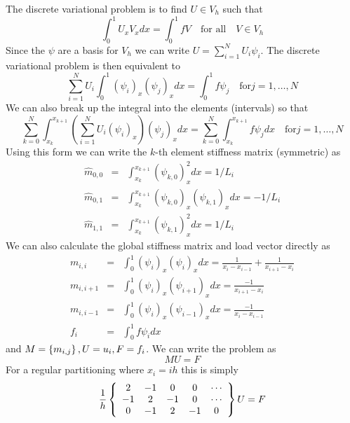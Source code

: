 \documentclass[10pt,dvips,twoside,reqno]{amsart}
\begin{document}
The discrete variational problem is to find $U \in V_h$ such that
\begin{equation}
\int_0^1 U_x V_x dx = \int_0^1 f V \quad \mbox{for all} \quad V \in V_h
\end{equation}
Since the $\psi$ are a basis for $V_h$ we can write $U = \sum_{i=1}^N U_i \psi_i$. The discrete variational problem is then equivalent to 
\begin{equation}
\sum_{i=1}^{N} U_{i} \int_0^1  (\psi_{i})_x (\psi_{j})_x dx = \int_0^1 f \psi_j \quad \mbox{for} j=1,\dots,N
\end{equation}
We can also break up the integral into the elements (intervals) so that
\begin{equation}
\sum_{k=0}^{N} \int_{x_k}^{x_{k+1}} (\sum_{i=1}^{N} U_i (\psi_i)_x)(\psi_j)_x dx = \sum_{k=0}^{N} \int_{x_k}^{x_{k+1}} f \psi_j dx \quad \mbox{for} j=1,\dots,N
\end{equation}
Using this form we can write the $k$-th element stiffness matrix (symmetric) as
\begin{eqnarray}
\hat{m}_{0,0} &=& \int_{x_k}^{x_{k+1}} (\psi_{k,0})_x^2 dx = 1/L_i \\
\hat{m}_{0,1} &=& \int_{x_k}^{x_{k+1}} (\psi_{k,0})_x (\psi_{k,1})_x dx = -1/L_i\\
\hat{m}_{1,1} &=& \int_{x_k}^{x_{k+1}} (\psi_{k,1})_x^2 dx = 1/L_i
\end{eqnarray}
We can also calculate the global stiffness matrix and load vector directly as
\begin{eqnarray}
m_{i,i} &=& \int_0^1  (\psi_{i})_x (\psi_{i})_x dx = \frac{1}{x_i - x_{i-1}} +\frac{1}{x_{i+1} - x_{i}} \\
m_{i,i+1} &=& \int_0^1  (\psi_{i})_x (\psi_{i+1})_x dx = \frac{-1}{x_{i+1} - x_{i}} \\
m_{i,i-1} &=& \int_0^1  (\psi_{i})_x (\psi_{i-1})_x dx = \frac{-1}{x_{i} - x_{i-1}} \\
f_i &=& \int_0^1 f \psi_i dx
\end{eqnarray}
and $M = \left\{ m_{i,j} \right\}, U = u_i, F = f_i$. We can write the problem as
\begin{equation}
M U = F
\end{equation}
For a regular partitioning where $x_i = ih$ this is simply
\begin{equation}
\frac{1}{h} \left\{ \begin{array}{ccccc}
 2 & -1 &  0 &  0 & \cdots \\
-1 &  2 & -1 &  0 & \cdots \\
 0 & -1 &  2 & -1 & 0 
\end{array} \right\}
U 
= F
\end{equation}
\end{document}
